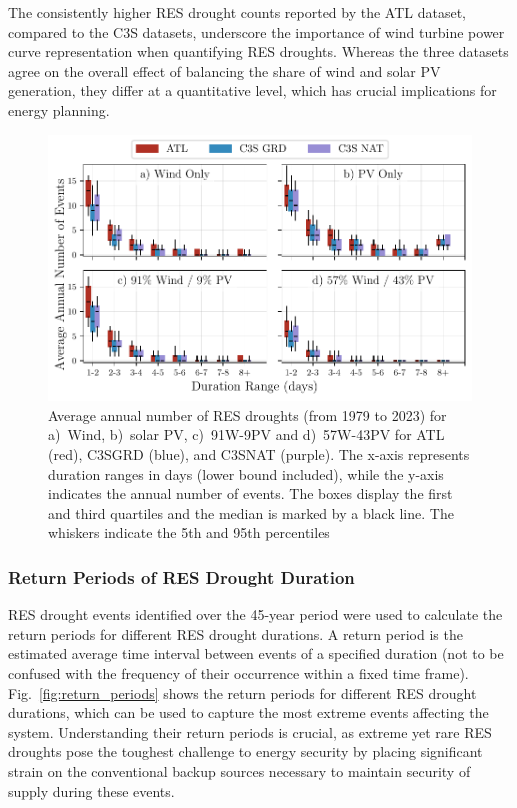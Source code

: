 \documentclass[preprint, 12pt]{elsarticle}
\providecommand{\DIFadd}[1]{{\protect\color{blue}\uwave{#1}}} %
\providecommand{\DIFaddFL}[1]{\DIFadd{#1}} %
\providecommand{\DIFaddbeginFL}{} %
\providecommand{\DIFaddendFL}{} %
\begin{document}
The consistently higher RES drought counts reported by the ATL dataset, compared to the C3S datasets, underscore the importance of wind turbine power curve representation when quantifying RES droughts. Whereas the three datasets agree on the overall effect of balancing the share of wind and solar PV generation, they differ at a quantitative level, which has crucial implications for energy planning.

\begin{figure}[!ht]
	\centering
	\includegraphics[width=\textwidth]{droughts_number_events.pdf}
	\caption{Average annual number of RES droughts (from 1979 to 2023) for a)~Wind, b)~solar PV, c)~91W-9PV and d)~57W-43PV for ATL (red), C3S\DIFaddbeginFL \DIFaddFL{~}\DIFaddendFL GRD (blue), and C3S\DIFaddbeginFL \DIFaddFL{~}\DIFaddendFL NAT (purple). The x-axis represents duration ranges in days (lower bound included), while the y-axis indicates the annual number of events. The boxes display the first and third quartiles and the median is marked by a black line. The whiskers indicate the 5th and 95th percentiles}
	\label{fig:boxplot_number_events}	
\end{figure}

\subsubsection{Return Periods of RES Drought Duration}

RES drought events identified over the 45-year period were used to calculate the return periods for different RES drought durations. A return period is the estimated average time interval between events of a specified duration (not to be confused with the frequency of their occurrence within a fixed time frame). Fig.~\ref{fig:return_periods} shows the return periods for different RES drought durations, which can be used to capture the most extreme events affecting the system. Understanding their return periods is crucial, as extreme yet rare RES droughts pose the toughest challenge to energy security by placing significant strain on the conventional backup sources necessary to maintain security of supply during these events.
\end{document}
